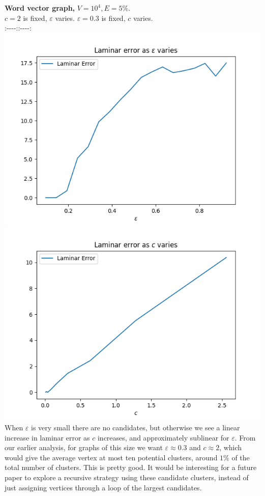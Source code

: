 \documentclass[
]{article}
\begin{document}
\textbf{Word vector graph,} {\(V = 10^{4},E = 5\%\)}.\\
{\(c = 2\)} is fixed, {\(\varepsilon\)} varies. \textbar{}
{\(\varepsilon = 0.3\)} is fixed, {\(c\)} varies.\\
:-\/-\/-\/-:\textbar:-\/-\/-\/-:\\
\includegraphics{images/laminar_error_as_epsilon_varies_word_vector.png}
\textbar{}
\includegraphics{images/laminar_error_as_c_varies_word_vector.png}\\
When {\(\varepsilon\)} is very small there are no candidates, but
otherwise we see a linear increase in laminar error as {\(c\)}
increases, and approximately sublinear for {\(\varepsilon\)}. From our
earlier analysis, for graphs of this size we want
{\(\varepsilon \approx 0.3\)} and {\(c \approx 2\)}, which would give
the average vertex at most ten potential clusters, around {\(1\%\)} of
the total number of clusters. This is pretty good. It would be
interesting for a future paper to explore a recursive strategy using
these candidate clusters, instead of just assigning vertices through a
loop of the largest candidates.
\end{document}
